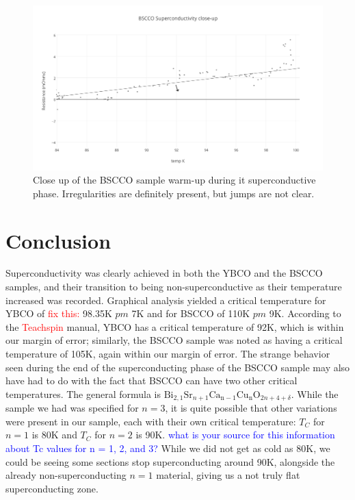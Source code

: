 \documentclass[prb,preprint]{revtex4-1}
\begin{document}
\begin{figure}[h!]
\centering
\includegraphics[width=7in]{bscco_superconductivity_close-up.png}
\caption{Close up of the BSCCO sample warm-up during it superconductive phase. Irregularities are definitely present, but jumps are not clear.}
\label{BSCCOplot2}
\end{figure}

\section{Conclusion}

Superconductivity was clearly achieved in both the YBCO and the BSCCO samples, and their transition to being non-superconductive as their temperature increased was recorded. Graphical analysis yielded a critical temperature for YBCO of \textcolor{red}{fix this:} 98.35K $pm$ 7K and for BSCCO of 110K $pm$ 9K. According to the \textcolor{red}{Teachspin} manual, YBCO has a critical temperature of 92K, which is within our margin of error; similarly, the BSCCO sample was noted as having a critical temperature of 105K, again within our margin of error. The strange behavior seen during the end of the superconducting phase of the BSCCO sample may also have had to do with the fact that BSCCO can have two other critical temperatures. The general formula is $\text{Bi}_{2,1}\text{Sr}_{n+1}\text{Ca}_{\text{n}-1}\text{Cu}_{\text{n}}\text{O}_{2n+4+\delta}$. While the sample we had was specified for $n=3$, it is quite possible that other variations were present in our sample, each with their own critical temperature: $T_C$ for $n=1$ is 80K and $T_C$ for $n=2$ is 90K. \textcolor{blue}{what is your source for this information about Tc values for n  = 1, 2, and 3?} While we did not get as cold as 80K, we could be seeing some sections stop superconducting around 90K, alongside the already non-superconducting $n=1$ material, giving us a not truly flat superconducting zone.
\end{document}
